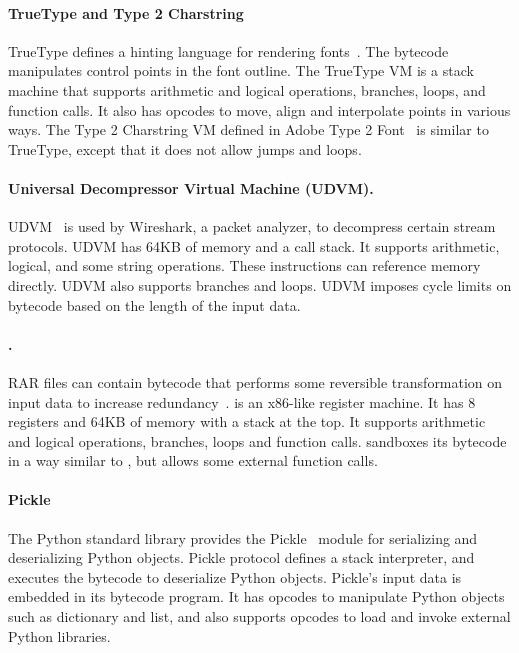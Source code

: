 \paragraph{TrueType and Type 2 Charstring}
%
TrueType defines a hinting language for rendering
fonts~\cite{truetype:intro}. The bytecode manipulates control
points in the font outline. The TrueType VM is a stack machine
that supports arithmetic and logical operations, branches, loops,
and function calls. It also has opcodes to move, align and
interpolate points in various ways. The Type 2 Charstring VM
defined in Adobe Type 2 Font~\cite{type2:spec} is similar to 
TrueType, except that it does not allow jumps and loops.


\paragraph{Universal Decompressor Virtual Machine (UDVM).}
%
UDVM~\cite{udvm:rfc} is used by Wireshark, a packet analyzer, to decompress
certain stream protocols. UDVM has 64KB of memory and a call stack. It supports
arithmetic, logical, and some string operations. These instructions can
reference memory directly. UDVM also supports branches and loops. UDVM imposes
cycle limits on bytecode based on the length of the input data.

\paragraph{\rarvm.}
%
RAR files can contain \rarvm bytecode that performs some
reversible transformation on input data to increase
redundancy~\cite{rar:vm}. \rarvm is an x86-like register machine.
It has 8 registers and 64KB of memory with a stack at the top.
It supports arithmetic and logical operations, branches, loops
and function calls. \rarvm sandboxes its bytecode in a way similar
to \clamav, but allows some external function calls.

\paragraph{Pickle}
%
The Python standard library provides the Pickle~\cite{pickle:vm}
module for serializing and deserializing Python objects. Pickle
protocol defines a stack interpreter, and executes the
bytecode to deserialize Python objects. Pickle's input data is
embedded in its bytecode program.  It has opcodes to manipulate
Python objects such as dictionary and list, and also supports
opcodes to load and invoke external Python libraries.

% 
% 
